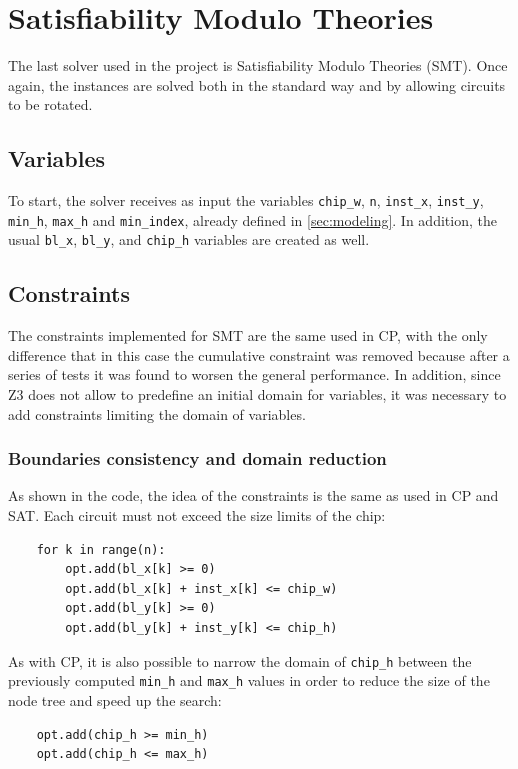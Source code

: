 \documentclass[a4paper, 12pt]{article}
\begin{document}
\clearpage


\section{Satisfiability Modulo Theories}\label{sec:smt}

The last solver used in the project is Satisfiability Modulo Theories (SMT). Once again, the instances are solved both in the standard way and by allowing circuits to be rotated.


\subsection{Variables}

To start, the solver receives as input the variables \verb|chip_w|, \verb|n|, \verb|inst_x|, \verb|inst_y|, \verb|min_h|, \verb|max_h| and \verb|min_index|, already defined in \cref{sec:modeling}. In addition, the usual \verb|bl_x|, \verb|bl_y|, and \verb|chip_h| variables are created as well.


\subsection{Constraints}

The constraints implemented for SMT are the same used in CP, with the only difference that in this case the cumulative constraint was removed because after a series of tests it was found to worsen the general performance. In addition, since Z3 does not allow to predefine an initial domain for variables, it was necessary to add constraints limiting the domain of variables.


\subsubsection{Boundaries consistency and domain reduction}

As shown in the code, the idea of the constraints is the same as used in CP and SAT. Each circuit must not exceed the size limits of the chip:
\begin{verbatim}
    for k in range(n):
        opt.add(bl_x[k] >= 0)
        opt.add(bl_x[k] + inst_x[k] <= chip_w)
        opt.add(bl_y[k] >= 0)
        opt.add(bl_y[k] + inst_y[k] <= chip_h)
\end{verbatim}

As with CP, it is also possible to narrow the domain of \verb|chip_h| between the previously computed \verb|min_h| and \verb|max_h| values in order to reduce the size of the node tree and speed up the search:
\begin{verbatim}
    opt.add(chip_h >= min_h)
    opt.add(chip_h <= max_h)
\end{verbatim}
\end{document}
